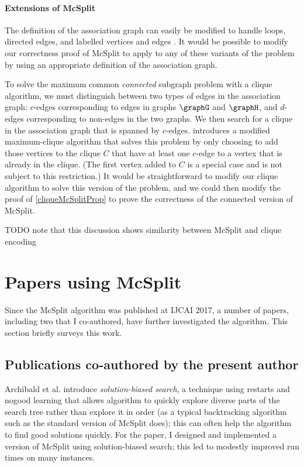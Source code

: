 \paragraph{Extensions of McSplit}
The definition of the association graph can easily be modified to handle loops,
directed edges, and labelled vertices and edges \cite{LeviG}.  It would be
possible to modify our correctness proof of McSplit to apply to any of these
variants of the problem by using an appropriate definition of the association
graph.

To solve the maximum common \emph{connected} subgraph problem with a clique algorithm,
we must distinguish between two types of edges in the association graph: $c$-edges
corresponding to edges in graphs $\graphG$ and $\graphH$, and $d$-edges corresponding
to non-edges in the two graphs.  We then search for a clique in the association graph
that is spanned by $c$-edges.
\cite{DBLP:journals/tcs/Koch01,DBLP:conf/mco/VismaraV08,DBLP:conf/cp/McCreeshNPS16}
\cite{DBLP:conf/cp/McCreeshNPS16} introduces a modified maximum-clique algorithm
that solves this problem by only choosing to add those vertices to the clique $C$ that
have at least one $c$-edge to a vertex that is already in the clique.  (The first
vertex added to $C$ is a special case and is not subject to this restriction.)
It would be straightforward to modify our clique algorithm to solve this version of the
problem, and we could then modify the proof of \cref{cliqueMcSplitProp} to prove the
correctness of the connected version of McSplit.


TODO note that this discussion shows similarity between McSplit and clique encoding

\section{Papers using McSplit}

Since the McSplit algorithm was published at IJCAI 2017, a number of papers, including
two that I co-authored, have further investigated the algorithm.
This section briefly surveys this work.

\subsection{Publications co-authored by the present author}

Archibald et al. \cite{DBLP:conf/cpaior/ArchibaldDHMP019} introduce \emph{solution-biased search},
a technique using restarts and nogood learning that allows algorithm to quickly explore diverse
parts of the search tree rather than explore it in order (as a typical backtracking algorithm
such as the standard version of McSplit does); this can often help the algorithm to find good
solutions quickly.  For the paper, I designed and implemented a version
of McSplit using solution-biased search; this led to modestly improved run times on many instances.

